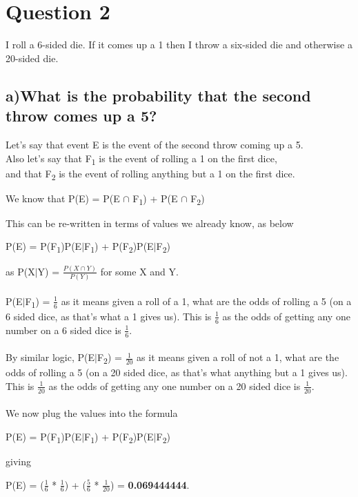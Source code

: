 \documentclass{report}
\begin{document}
		
		
		
		
				
	
	\section*{\hfil Question 2 \hfil}
	I roll a 6-sided die. If it comes up a 1 then I throw a six-sided die and otherwise a 20-sided die.
		\subsection*{a)What is the probability that the second throw comes up a 5?}
		Let's say that event E is the event of the second throw coming up a 5.\\
		Also let's say that F\textsubscript{1} is the event of rolling a 1 on the first dice,\\
		and that F\textsubscript{2} is the event of rolling anything but a 1 on the first dice.
		\begin{center}
			We know that P(E) = P(E $\cap$ F\textsubscript{1}) + P(E $\cap$ F\textsubscript{2})
		\end{center}
		This can be re-written in terms of values we already know, as below
		\begin{center}
			P(E) = P(F\textsubscript{1})P(E$\vert$F\textsubscript{1}) + P(F\textsubscript{2})P(E$\vert$F\textsubscript{2})
		\end{center}
		as P(X$\vert$Y) = $\frac{P(X \cap Y)}{P(Y)}$ for some X and Y.\\\\
		P(E$\vert$F\textsubscript{1}) = $\frac{1}{6}$ as it means given a roll of a 1, what are the odds of rolling a 5 (on a 6 sided dice, as that's what a 1 gives us). This is $\frac{1}{6}$ as the odds of getting any one number on a 6 sided dice is $\frac{1}{6}$.\\\\
		By similar logic, P(E$\vert$F\textsubscript{2}) = $\frac{1}{20}$ as it means given a roll of not a 1, what are the odds of rolling a 5 (on a 20 sided dice, as that's what anything but a 1 gives us). This is $\frac{1}{20}$ as the odds of getting any one number on a 20 sided dice is $\frac{1}{20}$.\\\\
		We now plug the values into the formula 
		\begin{center}
			P(E) = P(F\textsubscript{1})P(E$\vert$F\textsubscript{1}) + P(F\textsubscript{2})P(E$\vert$F\textsubscript{2})
		\end{center}
		giving
		\begin{center}
			P(E) = ($\frac{1}{6}$ * $\frac{1}{6}$) + ($\frac{5}{6}$ * $\frac{1}{20}$) = \textbf{0.069444444}.
		\end{center}
		
\end{document}
